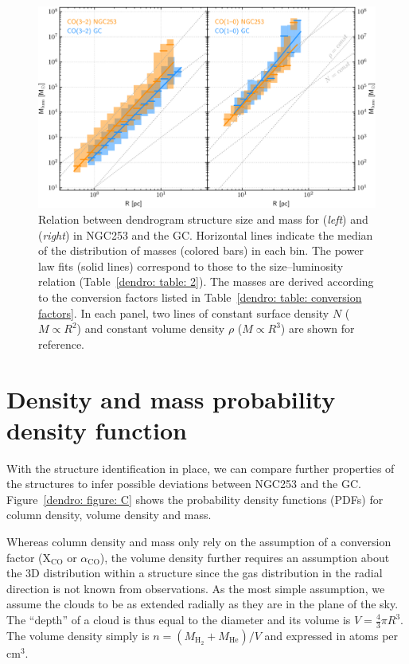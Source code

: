 \begin{figure}
    \centering
    \includegraphics[width=\textwidth]{images/chapters/papers/dendro/dendro_figB}
    \caption[Size--mass relation]{Relation between dendrogram structure size and mass for  (\emph{left}) and  (\emph{right}) in NGC253 and the GC. Horizontal lines indicate the median of the distribution of masses (colored bars) in each bin. The power law fits (solid lines) correspond to those to the size--luminosity relation (Table~\ref{dendro: table: 2}). The masses are derived according to the conversion factors listed in Table~\ref{dendro: table: conversion factors}.
    In each panel, two lines of constant surface density $N$ ($M \propto R^2$) and constant volume density $\rho$ ($M \propto R^3$) are shown for reference.
    \label{dendro: figure: B}}
\end{figure}




\section{Density and mass probability density function}
\label{appendix: dendro: mass density structure}

With the structure identification in place, we can compare further properties of the structures to infer possible deviations between NGC253 and the GC. 
Figure~\ref{dendro: figure: C} shows the probability density functions (PDFs) for column density, volume density and mass.

Whereas column density and mass only rely on the assumption of a conversion factor (X$_\mathrm{CO}$ or $\alpha_\mathrm{CO}$), the volume density further requires an assumption about the 3D distribution within a structure since the gas distribution in the radial direction is not known from observations. As the most simple assumption, we assume the clouds to be as extended radially as they are in the plane of the sky. The ``depth'' of a cloud is thus equal to the diameter and its volume is $V = \frac{4}{3} \pi R^3$. The volume density simply is $n = (M_\mathrm{H_2}+M_\mathrm{He})/V$ and expressed in atoms per cm$^3$.

